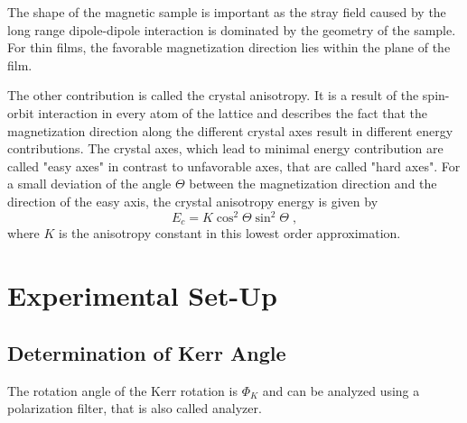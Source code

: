 \documentclass[a4paper]{scrartcl}
\numberwithin{equation}{section}
\numberwithin{figure}{section}
\numberwithin{table}{section}
\newcommand{\eq}[2]{\begin{equation}#1\label{#2}\end{equation}}
\begin{document}
The shape of the magnetic sample is important as the stray field caused by the long range dipole-dipole interaction is dominated by the geometry of the sample. For thin films, the favorable magnetization direction lies within the plane of the film.

The other contribution is called the crystal anisotropy. It is a result of the spin-orbit interaction in every atom of the lattice and describes the fact that the magnetization direction along the different crystal axes result in different energy contributions. The crystal axes, which lead to minimal energy contribution are called "easy axes" in contrast to unfavorable axes, that are called "hard axes". For a small deviation of the angle $\Theta$ between the magnetization direction and the direction of the easy axis, the crystal anisotropy energy is given by
\eq{E_c=K \cos^2 \Theta \sin^2 \Theta \; , }{aniso}
where $K$ is the anisotropy constant in this lowest order approximation.


\section{Experimental Set-Up}
\subsection{Determination of Kerr Angle}
The rotation angle of the Kerr rotation is $\Phi_K$ and can be analyzed using a polarization filter, that is also called analyzer.



 

\end{document}

